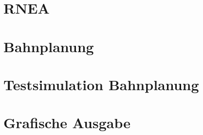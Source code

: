 \section{RNEA}
\label{add:rnea}

%
\setcounter{chapter}{2}
\setcounter{section}{4}
\setcounter{table}{0}
\setcounter{figure}{0}
%
\section{Bahnplanung}
\label{add:traj}

%
\setcounter{chapter}{2}
\setcounter{section}{5}
\setcounter{table}{0}
\setcounter{figure}{0}
%
\section{Testsimulation Bahnplanung}
\label{add:sim}

%
\setcounter{chapter}{2}
\setcounter{section}{5}
\setcounter{table}{0}
\setcounter{figure}{0}
%
\section{Grafische Ausgabe}
\label{add:plot}


